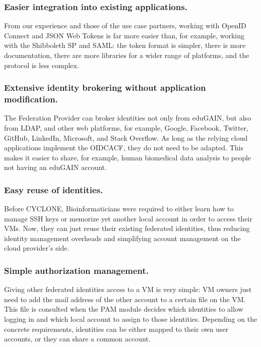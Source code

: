 \documentclass{llncs}
\begin{document}
\subsubsection{Easier integration into existing applications.}

From our experience and those of the use case partners, working with OpenID Connect and JSON Web Tokens is far more easier than, for example, working with the Shibboleth SP and SAML: the token format is simpler, there is more documentation, there are more libraries for a wider range of platforms, and the protocol is less complex.

\subsubsection{Extensive identity brokering without application modification.}

The Federation Provider can broker identities not only from eduGAIN, but also from LDAP, and other web platforms, for example, Google, Facebook, Twitter, GitHub, LinkedIn, Microsoft, and Stack Overflow. As long as the relying cloud applications implement the OIDCACF, they do not need to be adapted. This makes it easier to share, for example, human biomedical data analysis to people not having an eduGAIN account.

\subsubsection{Easy reuse of identities.} Before CYCLONE, Bioinformaticians were required to either learn how to manage SSH keys or memorize yet another local account in order to access their VMs. Now, they can just reuse their existing federated identities, thus reducing identity management overheads and simplifying account management on the cloud provider's side.

\subsubsection{Simple authorization management.} Giving other federated identities access to a VM is very simple: VM owners just need to add the mail address of the other account to a certain file on the VM. This file is consulted when the PAM module decides which identities to allow logging in and which local account to assign to those identities. Depending on the concrete requirements, identities can be either mapped to their own user accounts, or they can share a common account.
\end{document}
